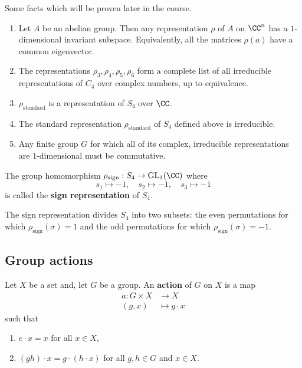 \documentclass[12pt, a4paper]{article}
\newcommand{\gl}{\text{GL}}
\begin{document}
\begin{mdthm}
    Some facts which will be proven later in the course.
    \begin{enumerate}
        \item Let \(A\) be an abelian group. Then any representation \(\rho\) of \(A\) on \(\CC^n\) has a \(1\)-dimensional invariant subspace. Equivalently, all the matrices \(\rho(a)\) have a common eigenvector.
        \item The representations \(\rho_3,\rho_4,\rho_5,\rho_6\) form a complete list of all irreducible \\ representations of \(C_4\) over complex numbers, up to equivalence.
        \item \(\rho_{\text{standard}}\) is a representation of \(S_4\) over \(\CC\).
        \item The standard representation \(\rho_{\text{standard}}\) of \(S_4\) defined above is irreducible.
        \item Any finite group \(G\) for which all of its complex, irreducible representations are \(1\)-dimensional must be commutative.
    \end{enumerate}
\end{mdthm}

\begin{definition}
    The group homomorphism \(\rho_{\text{sign}} :S_4 \to \gl_1(\CC)\) where 
    \[s_1 \mapsto -1, \quad s_2 \mapsto -1,\quad  s_3 \mapsto -1\]
    is called the \textbf{sign representation} of \(S_4\).
\end{definition}

\begin{mdremark}
    The sign representation divides \(S_4\) into two subsets: the even permutations for which \(\rho_{\text{sign}}(\sigma)=1\) and the odd permutations for which \(\rho_{\text{sign}}(\sigma)=-1\). 
\end{mdremark}

\subsection{Group actions}

\begin{definition}
    Let \(X\) be a set and, let \(G\) be a group. An \textbf{action} of \(G\) on \(X\) is a map 
    \[\begin{aligned}
        a : G \times X &\to X \\ 
        (g,x) &\mapsto g\cdot x
    \end{aligned}\]
    such that 
    \begin{enumerate}
        \item \(e \cdot x = x\) for all \(x \in X\),
        \item \((gh)\cdot x = g\cdot (h\cdot x)\) for all \(g,h\in G\) and \(x \in X\).
    \end{enumerate}
\end{definition}
\end{document}
